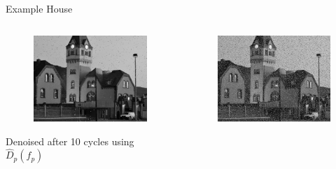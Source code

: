 \documentclass[mathserif]{beamer}
\begin{document}
\begin{frame}{Example House}
 \begin{columns}
        \begin{column}{.3\textwidth}
            \begin{figure}
                \centering
                \includegraphics[width=\textwidth]{../testimages/houses/houses_500_20/denoised_house_500_20percent_10_cycle.png}
            \end{figure}
                \centering
                Denoised after 10 cycles using $\hat D_p(f_p)$ 
        \end{column}
        \begin{column}{.3\textwidth}
            \begin{figure}
                \centering
                \includegraphics[width=\textwidth]{../testimages/houses/houses_500_20/house_500_20percent.png}

\end{figure}
\end{column}
\end{columns}
\end{frame}
\end{document}
